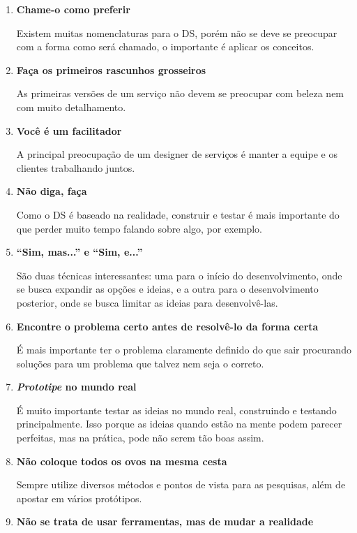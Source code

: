 \begin{enumerate}
	\item \textbf{Chame-o como preferir}
	
	Existem muitas nomenclaturas para o DS, porém não se deve se preocupar com a forma como será chamado, o importante é aplicar os conceitos.
	
	\item \textbf{Faça os primeiros rascunhos grosseiros}
	
	As primeiras versões de um serviço não devem se preocupar com beleza nem com muito detalhamento.
	
	\item \textbf{Você é um facilitador}
	
	A principal preocupação de um designer de serviços é manter a equipe e os clientes trabalhando juntos.
	
	\item \textbf{Não diga, faça}
	
	Como o DS é baseado na realidade, construir e testar é mais importante do que perder muito tempo falando sobre algo, por exemplo.
	
	\item \textbf{``Sim, mas...'' e ``Sim, e...''}
	
	São duas técnicas interessantes: uma para o início do desenvolvimento, onde se busca expandir as opções e ideias, e a outra para o desenvolvimento posterior, onde se busca limitar as ideias para desenvolvê-las.
	
	\item \textbf{Encontre o problema certo antes de resolvê-lo da forma certa}
	
	É mais importante ter o problema claramente definido do que sair procurando soluções para um problema que talvez nem seja o correto.
	
	\item \textbf{\textit{Prototipe} no mundo real}
	
	É muito importante testar as ideias no mundo real, construindo e testando principalmente. Isso porque as ideias quando estão na mente podem parecer perfeitas, mas na prática, pode não serem tão boas assim.
	
	\item \textbf{Não coloque todos os ovos na mesma cesta}
	
	Sempre utilize diversos métodos e pontos de vista para as pesquisas, além de apostar em vários protótipos.
	
	\item \textbf{Não se trata de usar ferramentas, mas de mudar a realidade}
	

\end{enumerate}
